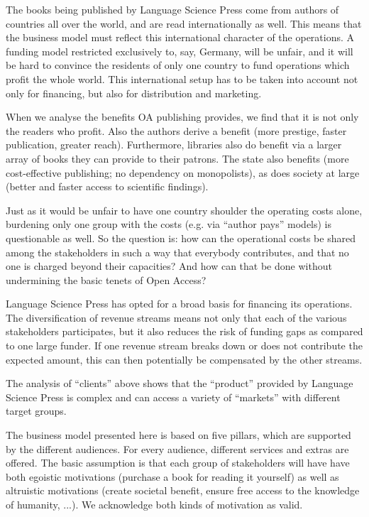\documentclass[nonflat,smallfont
]{langsci/langscibook}
\begin{document}
{The books being published by Language Science Press come from authors of countries all over the world, and are read internationally as well. This means that the business model must reflect this international character of the operations. A funding model restricted exclusively to, say, Germany, will be unfair, and it will be hard to convince the residents of only one country to fund operations which profit the whole world. This international setup has to be taken into account not only for financing, but also for distribution and marketing. 
 
When we analyse the benefits OA publishing provides, we find that it is not only the readers who profit. Also the authors derive a benefit (more prestige, faster publication, greater reach). Furthermore, libraries also do benefit via a larger array of books they can provide to their patrons. The state also benefits (more cost-effective publishing; no dependency on monopolists), as does society at large (better and faster access to scientific findings). 

Just as it would be unfair to have one country shoulder the operating costs alone, burdening only one group with the costs (e.g. via ``author pays'' models) is questionable as well. So the question is: how can the operational costs be shared among the stakeholders in such a way that everybody contributes, and that no one is charged beyond their capacities? And how can that be done without undermining the basic tenets of Open Access?

Language Science Press has opted for a broad basis for financing its operations. The diversification of revenue streams means not only that each of the various stakeholders participates, but it also reduces the risk of funding gaps as compared to one large funder. If one revenue stream breaks down or does not contribute the expected amount, this can then potentially be compensated by the other streams. 

The analysis of ``clients'' above shows that the ``product'' provided by Language Science Press is complex and can access a variety of ``markets'' with different target groups. 
 
The business model presented here is based on five pillars, which are supported by the different audiences. For every audience, different services and extras are offered. The basic assumption is that each group of stakeholders will have have both egoistic motivations (purchase a book for reading it yourself) as well as altruistic motivations (create societal benefit, ensure free access to the knowledge of humanity, ...).  We acknowledge both kinds of motivation as valid. 

}
\end{document}
